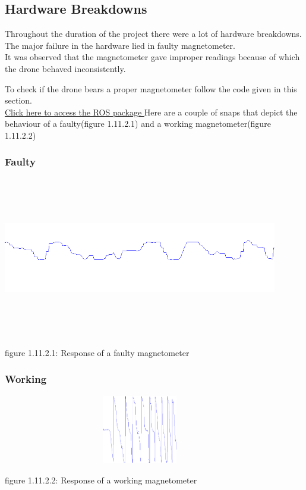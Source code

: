 \documentclass[a4paper,12pt,oneside]{book}
\begin{document}
\subsection{Hardware Breakdowns}
Throughout the duration of the project there were a lot of hardware breakdowns.\\
The major failure in the hardware lied in faulty magnetometer.\\
It was observed that the magnetometer gave improper readings because of which the drone behaved inconsistently.

To check if the drone bears a proper magnetometer follow the code given in this section.\\
\href{https://github.com/eYSIP-2018/Autotuning-of-Controller-For-Drone/tree/master/magnetometer_check}{Click here to access the ROS package }
Here are a couple of snaps that depict the behaviour of a faulty(figure 1.11.2.1) and a working magnetometer(figure 1.11.2.2)\\
\subsubsection{Faulty}
\includegraphics[width = 12cm , height= 7cm]{faulty.png}
\begin{center}
    figure 1.11.2.1: Response of a faulty magnetometer
\end{center}

\subsubsection{Working}
\includegraphics[width = 12cm , height= 3cm]{proper-mag.png}
\begin{center}
    figure 1.11.2.2: Response of a working magnetometer
\end{center}
\end{document}

